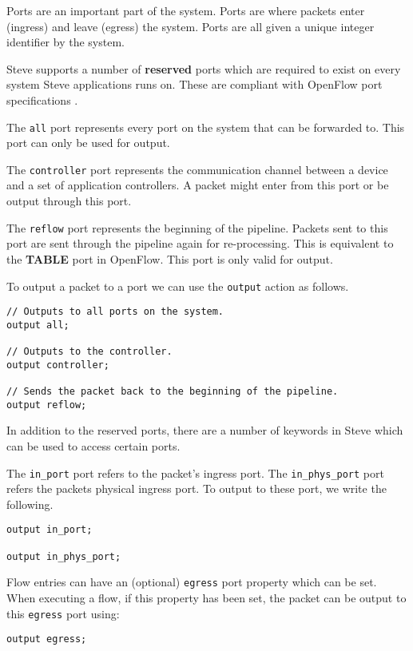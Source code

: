 Ports are an important part of the system. Ports are where packets enter (ingress) and leave (egress) the system. Ports are all given a unique integer identifier by the system.

Steve supports a number of \textbf{reserved} ports which are required to exist on every system Steve applications runs on. These are compliant with OpenFlow port specifications \cite{openflow_spec}.

The \texttt{all} port represents every port on the system that can be forwarded to. This port can only be used for output.

The \texttt{controller} port represents the communication channel between a device and a set of application controllers. A packet might enter from this port or be output through this port.

The \texttt{reflow} port represents the beginning of the pipeline. Packets sent to this port are sent through the pipeline again for re-processing. This is equivalent to the \textbf{TABLE} port in OpenFlow. This port is only valid for output.

To output a packet to a port we can use the \texttt{output} action as follows.

\begin{lstlisting}
// Outputs to all ports on the system.
output all; 

// Outputs to the controller.
output controller; 

// Sends the packet back to the beginning of the pipeline.
output reflow; 
\end{lstlisting}

In addition to the reserved ports, there are a number of keywords in Steve which can be used to access certain ports.

The \texttt{in\_port} port refers to the packet's ingress port. The \texttt{in\_phys\_port} port refers the packets physical ingress port. To output to these port, we write the following.

\begin{lstlisting}
output in_port;

output in_phys_port;
\end{lstlisting}

Flow entries can have an (optional) \texttt{egress} port property which can be set. When executing a flow, if this property has been set, the packet can be output to this \texttt{egress} port using:

\begin{lstlisting}
output egress;
\end{lstlisting}

